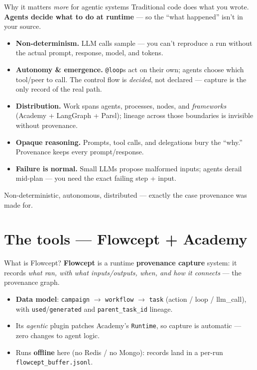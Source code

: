 \documentclass[aspectratio=169,11pt]{beamer}
\begin{document}
\begin{frame}{Why it matters \emph{more} for agentic systems}
  Traditional code does what you wrote. \textbf{Agents decide what to do at
  runtime} --- so the ``what happened'' isn't in your source.
  \begin{itemize}\footnotesize
    \item \textbf{Non-determinism.} LLM calls sample --- you can't reproduce a run
      without the actual prompt, response, model, and tokens.
    \item \textbf{Autonomy \& emergence.} \texttt{@loop}s act on their own; agents
      choose which tool/peer to call. The control flow is \emph{decided}, not
      declared --- capture is the only record of the real path.
    \item \textbf{Distribution.} Work spans agents, processes, nodes, and
      \emph{frameworks} (Academy + LangGraph + Parsl); lineage across those
      boundaries is invisible without provenance.
    \item \textbf{Opaque reasoning.} Prompts, tool calls, and delegations bury the
      ``why.'' Provenance keeps every prompt/response.
    \item \textbf{Failure is normal.} Small LLMs propose malformed inputs; agents
      derail mid-plan --- you need the exact failing step + input.
  \end{itemize}
  \centering\footnotesize\alert{Non-deterministic, autonomous, distributed ---
  exactly the case provenance was made for.}
\end{frame}

\section{The tools --- Flowcept + Academy}

\begin{frame}{What is Flowcept?}
  \textbf{Flowcept} is a runtime \textbf{provenance capture} system: it records
  \emph{what ran, with what inputs/outputs, when, and how it connects} --- the
  provenance graph.
  \vspace{0.3em}
  \begin{itemize}
    \item \textbf{Data model}: \texttt{campaign} $\to$ \texttt{workflow} $\to$
      \texttt{task} (action / loop / llm\_call), with \texttt{used}/\texttt{generated}
      and \texttt{parent\_task\_id} lineage.
    \item Its \emph{agentic} plugin patches Academy's \texttt{Runtime}, so capture is
      \alert{automatic --- zero changes to agent logic}.
    \item Runs \textbf{offline} here (no Redis / no Mongo): records land in a per-run
      \texttt{flowcept\_buffer.jsonl}.
  \end{itemize}
\end{frame}
\end{document}
